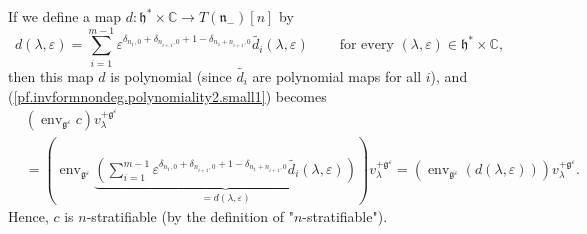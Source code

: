 \documentclass
[numbers=enddot,12pt,final,onecolumn,german,notitlepage]{scrartcl}%
\theoremstyle{definition}
\begin{document}
If we define a map $d:\mathfrak{h}^{\ast}\times\mathbb{C}\rightarrow T\left(
\mathfrak{n}_{-}\right)  \left[  n\right]  $ by%
\[
d\left(  \lambda,\varepsilon\right)  =\sum\limits_{i=1}^{m-1}\varepsilon
^{\delta_{n_{1},0}+\delta_{n_{i+1},0}+1-\delta_{n_{1}+n_{i+1},0}%
}\widetilde{d_{i}}\left(  \lambda,\varepsilon\right)
\ \ \ \ \ \ \ \ \ \ \text{for every }\left(  \lambda,\varepsilon\right)
\in\mathfrak{h}^{\ast}\times\mathbb{C},
\]
then this map $d$ is polynomial (since $\widetilde{d_{i}}$ are polynomial maps
for all $i$), and (\ref{pf.invformnondeg.polynomiality2.small1}) becomes%
\begin{align*}
&  \left(  \operatorname*{env}\nolimits_{\mathfrak{g}^{\varepsilon}}c\right)
v_{\lambda}^{+\mathfrak{g}^{\varepsilon}}\\
&  =\left(  \operatorname*{env}\nolimits_{\mathfrak{g}^{\varepsilon}%
}\underbrace{\left(  \sum\limits_{i=1}^{m-1}\varepsilon^{\delta_{n_{1}%
,0}+\delta_{n_{i+1},0}+1-\delta_{n_{1}+n_{i+1},0}}\widetilde{d_{i}}\left(
\lambda,\varepsilon\right)  \right)  }_{=d\left(  \lambda,\varepsilon\right)
}\right)  v_{\lambda}^{+\mathfrak{g}^{\varepsilon}}=\left(
\operatorname*{env}\nolimits_{\mathfrak{g}^{\varepsilon}}\left(  d\left(
\lambda,\varepsilon\right)  \right)  \right)  v_{\lambda}^{+\mathfrak{g}%
^{\varepsilon}}.
\end{align*}
Hence, $c$ is $n$-stratifiable (by the definition of "$n$-stratifiable").
\end{document}
